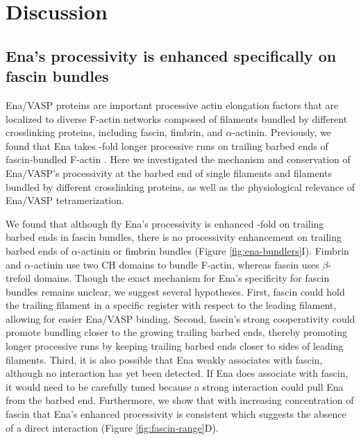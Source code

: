 \section{Discussion}\label{ch02-discussion}

\subsection{Ena's processivity is enhanced specifically on fascin bundles}\label{ena-discuss-specific-fascin}

Ena/VASP proteins are important processive actin elongation factors that are localized to diverse F-actin networks composed of filaments bundled by different crosslinking proteins, including fascin, fimbrin, and $\alpha$-actinin. Previously, we found that Ena takes -fold longer processive runs on trailing barbed ends of fascin-bundled F-actin \citep{winkelman_ena/vasp_2014}. Here we investigated the mechanism and conservation of Ena/VASP's processivity at the barbed end of single filaments and filaments bundled by different crosslinking proteins, as well as the physiological relevance of Ena/VASP tetramerization.

We found that although fly Ena's processivity is enhanced -fold on trailing barbed ends in fascin bundles, there is no processivity enhancement on trailing barbed ends of $\alpha$-actinin or fimbrin bundles (Figure \ref{fig:ena-bundlers}I). Fimbrin and $\alpha$-actinin use two CH domains to bundle F-actin, whereas fascin uses $\beta$-trefoil domains. Though the exact mechanism for Ena's specificity for fascin bundles remains unclear, we suggest several hypotheses. First, fascin could hold the trailing filament in a specific register with respect to the leading filament, allowing for easier Ena/VASP binding. Second, fascin's strong cooperativity \citep{yamakita_phosphorylation_1996,winkelman_fascin-_2016} could promote bundling closer to the growing trailing barbed ends, thereby promoting longer processive runs by keeping trailing barbed ends closer to sides of leading filaments. Third, it is also possible that Ena weakly associates with fascin, although no interaction has yet been detected. If Ena does associate with fascin, it would need to be carefully tuned because a strong interaction could pull Ena from the barbed end. Furthermore, we show that with increasing concentration of fascin that Ena's enhanced processivity is consistent which suggests the absence of a direct interaction (Figure \ref{fig:fascin-range}D).

